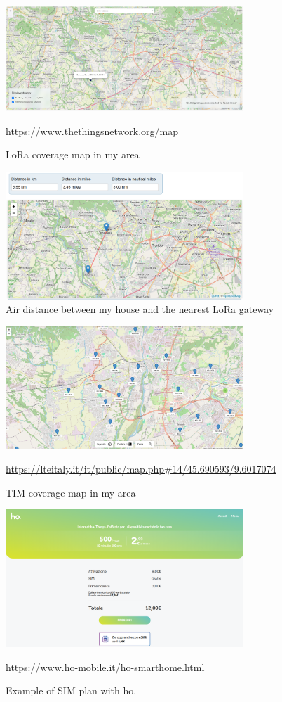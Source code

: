 \documentclass[12pt]{article}
\begin{document}
\begin{figure}[H]
    \centering
    \includegraphics[width=0.8\textwidth]{./lora-coverage.png}
    \caption{LoRa coverage map in my area}
    \url{https://www.thethingsnetwork.org/map}
\end{figure}

\begin{figure}[H]
    \centering
    \includegraphics[width=0.8\textwidth]{./air-distance.png}
    \caption{Air distance between my house and the nearest LoRa gateway}
\end{figure}

\begin{figure}[H]
    \centering
    \includegraphics[width=0.8\textwidth]{./tim-coverage.png}
    \caption{TIM coverage map in my area}
    \url{https://lteitaly.it/it/public/map.php#14/45.690593/9.6017074}
\end{figure}


\begin{figure}[H]
    \centering
    \includegraphics[width=0.8\textwidth]{./ho-sim.png}
    \caption{Example of SIM plan with ho.}
    \url{https://www.ho-mobile.it/ho-smarthome.html}
\end{figure}
\end{document}
